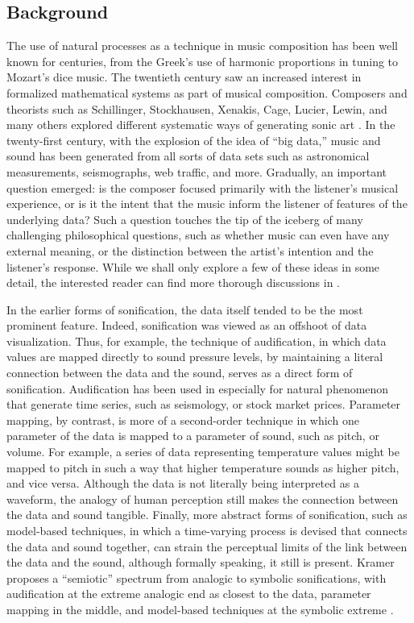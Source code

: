 \subsection{Background}
\label{sec:background}
The use of natural processes as a technique in music composition has been 
well known for centuries, from the Greek's use of harmonic proportions in 
tuning to Mozart's dice music. The twentieth century saw an increased 
interest in formalized mathematical systems as part of musical composition. 
Composers and theorists such as Schillinger, Stockhausen, Xenakis, Cage, 
Lucier, Lewin, and many others explored different systematic ways of 
generating sonic art \cite{schillinger1949schillinger, stockhausen1962concept, xenakis1992formalized, cage2011silence, lucier1998origins, lewin2010generalized}.
 In the twenty-first century, with the explosion of the 
idea of ``big data,'' music and sound has been generated from all sorts of 
data sets such as astronomical measurements, seismographs, web traffic, and 
more. Gradually, an important question emerged: is the composer focused 
primarily with the listener's musical experience, or is it the intent that 
the music inform the listener of features of the underlying data? Such a 
question touches the tip of the iceberg of many challenging philosophical 
questions, such as whether music can even have any external meaning, or the 
distinction between the artist's intention and the listener's response. While 
we shall only explore a few of these ideas in some detail, the interested 
reader can find more thorough discussions in \cite{demers2010listening}.

In the earlier forms of sonification, the data itself tended to be the most 
prominent feature. Indeed, sonification was viewed as an offshoot of data 
visualization. Thus, for example, the technique of audification, in which 
data values are mapped directly to sound pressure levels, by maintaining a 
literal connection between the data and the sound, serves as a direct form of 
sonification. Audification has been used in especially for natural phenomenon 
that generate time series, such as seismology, or stock market prices. 
Parameter mapping, by contrast, is more of a second-order technique in which 
one parameter of the data is mapped to a parameter of sound, such as pitch, 
or volume. For example, a series of data representing temperature values 
might be mapped to pitch in such a way that higher temperature sounds as 
higher pitch, and vice versa. Although the data is not literally being 
interpreted as a waveform, the analogy of human perception still makes the 
connection between the data and sound tangible. Finally, more abstract forms 
of sonification, such as model-based techniques, in which a time-varying 
process is devised that connects the data and sound together, can strain the 
perceptual limits of the link between the data and the sound, although 
formally speaking, it still is present. Kramer proposes a ``semiotic'' 
spectrum from analogic to symbolic sonifications, with audification at the 
extreme analogic end as closest to the data, parameter mapping in the middle, 
and model-based techniques at the symbolic extreme \cite{hermann2011sonification}.

